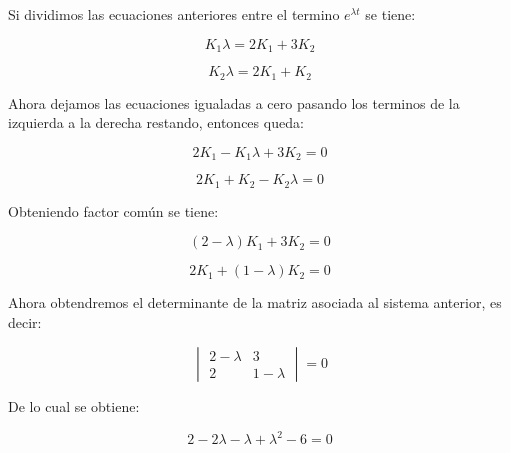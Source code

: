 \documentclass[titlepage]{article}
\begin{document}
      	 Si dividimos las ecuaciones anteriores entre el termino $e^{\lambda t}$ se tiene:
      	 
      	 \begin{equation*}
      	 	K_1\lambda = 2K_1 + 3K_2
      	 \end{equation*}
      	 	
      	 \begin{equation*}
      	 	K_2\lambda  = 2K_1 + K_2
      	 \end{equation*}
      	 
      	 Ahora dejamos las ecuaciones igualadas a cero pasando los terminos de la izquierda a la derecha restando, entonces queda:
      	 
      	 \begin{equation*}
      	 	2K_1 - K_1\lambda + 3K_2 = 0
      	 \end{equation*}
      	 	
      	 \begin{equation*}
      	 	2K_1 + K_2 - K_2\lambda  = 0
      	 \end{equation*}
      	
      	Obteniendo factor común se tiene:
      	
      	 	\begin{equation}
      	 		(2 - \lambda)K_1 + 3K_2 = 0
      	 		\label{3}
      	 	\end{equation}
      	 	
      	 \begin{equation}
      	 	2K_1 + (1 - \lambda)K_2  = 0
      	 	\label{4}
      	 \end{equation}	
      	 
      	 Ahora obtendremos el determinante de la matriz asociada al sistema anterior, es decir:
      	 
      	 \begin{equation*}
      	 	\begin{vmatrix}
      	 		2 - \lambda & 3\\
      	 		2 & 1 - \lambda
      	 	\end{vmatrix}
      	 	= 0
      	  \end{equation*}
      	  
      	  De lo cual se obtiene:
      	  
      	  \begin{equation*}      	  
      	  	2 - 2\lambda - \lambda + \lambda^2 - 6 = 0 	  	
      	  \end{equation*}
      	  
\end{document}

